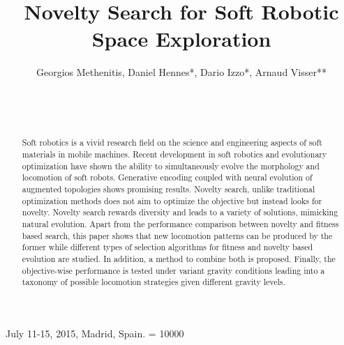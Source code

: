\documentclass{sig-alternate}
\begin{document}
  {July 11-15, 2015, Madrid, Spain.}
    \widowpenalty = 10000

\title{Novelty Search for Soft Robotic Space Exploration}

\author{
\alignauthor
		Georgios Methenitis, Daniel Hennes*, Dario Izzo*, Arnaud Visser**\\
       \\
       \\
       \\
}

\maketitle
\begin{abstract}
Soft robotics is a vivid research field on the science and engineering aspects of soft materials in mobile machines. Recent development in soft robotics and evolutionary optimization have shown the ability to simultaneously evolve the morphology and locomotion of soft robots. Generative encoding coupled with neural evolution of augmented topologies shows promising results. Novelty search, unlike traditional optimization methods does not aim to optimize the objective but instead looks for novelty. Novelty search rewards diversity and leads to a variety of solutions, mimicking natural evolution. Apart from the performance comparison between novelty and fitness based search, this paper shows that new locomotion patterns can be produced by the former while different types of selection algorithms for fitness and novelty based evolution are studied. In addition, a method to combine both is proposed. Finally, the objective-wise performance is tested under variant gravity conditions leading into a taxonomy of possible locomotion strategies given different gravity levels.
\end{abstract}

\end{document}
